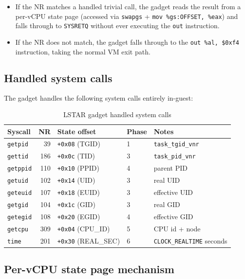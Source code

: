 \begin{itemize}
  \item If the NR matches a handled trivial call, the gadget reads the
    result from a per-vCPU state page (accessed via \texttt{swapgs} +
    \texttt{mov \%gs:OFFSET, \%eax}) and falls through to \texttt{SYSRETQ}
    without ever executing the \texttt{out} instruction.
  \item If the NR does not match, the gadget falls through to the
    \texttt{out \%al, \$0xf4} instruction, taking the normal VM exit path.
\end{itemize}

\subsection{Handled system calls}

The gadget handles the following system calls entirely in-guest:

\begin{table}[ht]
\centering
\caption{LSTAR gadget handled system calls}
\label{tab:gadget-syscalls}
\begin{tabular}{lrlll}
\toprule
\textbf{Syscall} & \textbf{NR} & \textbf{State offset} & \textbf{Phase} & \textbf{Notes} \\
\midrule
\texttt{getpid}   & 39  & \texttt{+0x08} (TGID)     & 1 & \texttt{task\_tgid\_vnr} \\
\texttt{gettid}   & 186 & \texttt{+0x0c} (TID)      & 3 & \texttt{task\_pid\_vnr} \\
\texttt{getppid}  & 110 & \texttt{+0x10} (PPID)     & 4 & parent PID \\
\texttt{getuid}   & 102 & \texttt{+0x14} (UID)      & 3 & real UID \\
\texttt{geteuid}  & 107 & \texttt{+0x18} (EUID)     & 3 & effective UID \\
\texttt{getgid}   & 104 & \texttt{+0x1c} (GID)      & 3 & real GID \\
\texttt{getegid}  & 108 & \texttt{+0x20} (EGID)     & 4 & effective GID \\
\texttt{getcpu}   & 309 & \texttt{+0x04} (CPU\_ID)  & 5 & CPU id + node \\
\texttt{time}     & 201 & \texttt{+0x30} (REAL\_SEC) & 6 & \texttt{CLOCK\_REALTIME} seconds \\
\bottomrule
\end{tabular}
\end{table}

\subsection{Per-vCPU state page mechanism}

